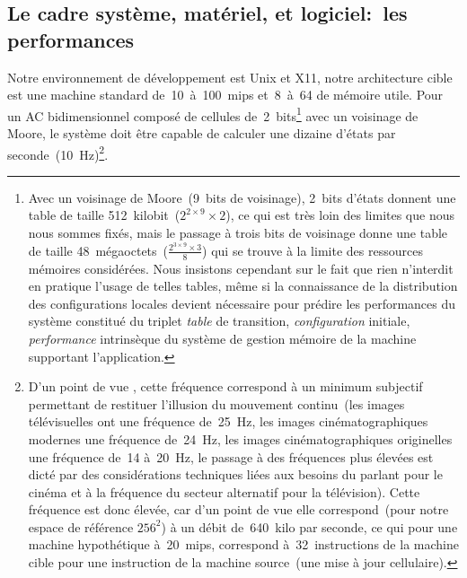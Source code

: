 \subsection*{Le cadre syst\`eme, mat\'eriel, et logiciel:~les performances}

Notre environnement de d\'eveloppement est Unix et X11, notre
architecture cible est une machine standard de~10~\`a~100~mips
et~8~\`a~64  %
de m\'emoire utile. %
Pour un AC bidimensionnel compos\'e de 
cellules de~2~bits\footnote{%
  Avec un voisinage de Moore~(9~bits de voisinage), 2~bits d'\'etats
  donnent une table de taille 512~kilobit~($2^{2 \times  9} \times  2$), ce qui
  est tr\`es loin des limites que nous nous sommes fix\'es, mais le passage
  \`a trois bits de voisinage donne une table de taille
  48~m\'egaoctets~($\frac{2^{3 \times  9} \times  3}{8}$) qui se trouve \`a la limite
  des ressources m\'emoires consid\'er\'ees. %
  Nous insistons cependant sur le fait que rien n'interdit en pratique
  l'usage de telles tables, m\^eme si la connaissance de la
  distribution des configurations locales devient n\'ecessaire pour
  pr\'edire les performances du syst\`eme constitu\'e du triplet
  \emph{table} de transition, \emph{configuration} initiale,
  \emph{performance} intrins\`eque du syst\`eme de gestion m\'emoire de la
  machine supportant l'application.} %
avec un voisinage de Moore, le syst\`eme doit \^etre capable de calculer
une dizaine d'\'etats par seconde~(10~Hz)\footnote{%
  D'un point de vue , cette fr\'equence correspond \`a
  un minimum subjectif permettant de restituer l'illusion du mouvement
  continu~(les images t\'el\'evisuelles ont une fr\'equence de~25~Hz, les
  images cin\'ematographiques modernes une fr\'equence de~24~Hz, les
  images cin\'ematographiques originelles une fr\'equence de~14 \`a~20~Hz,
  le passage \`a des fr\'equences plus \'elev\'ees est dict\'e par des
  consid\'erations techniques li\'ees aux besoins du parlant pour le cin\'ema
  et \`a la fr\'equence du secteur alternatif pour la t\'el\'evision). %
  Cette fr\'equence est donc \'elev\'ee, car d'un point de vue
   elle correspond~(pour notre espace de r\'ef\'erence
  $256^2$) \`a un d\'ebit de~640~kilo  par
  seconde, ce qui pour une machine hypoth\'etique \`a~20~mips, correspond
  \`a~32~instructions de la machine cible pour une instruction de la
  machine source~(une mise \`a jour cellulaire).}. %
